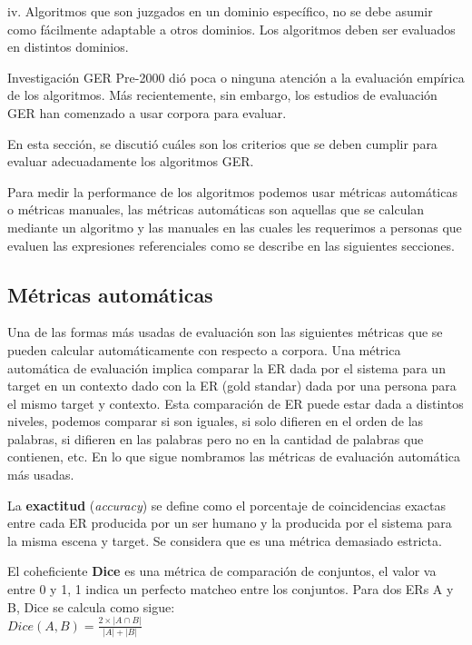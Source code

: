 iv. Algoritmos que son juzgados en un dominio espec\'ifico, no se debe asumir como
f\'acilmente adaptable a otros dominios. Los algoritmos deben ser evaluados en distintos dominios.

Investigaci\'on GER Pre-2000 di\'o poca o ninguna atenci\'on a la evaluaci\'on emp\'irica de los algoritmos. M\'as 
recientemente, sin embargo, los estudios de evaluaci\'on GER han comenzado a usar corpora para evaluar.

En esta secci\'on, se discuti\'o cu\'ales son los criterios que se deben cumplir
para evaluar adecuadamente los algoritmos GER.

Para medir la performance de los algoritmos podemos usar m\'etricas autom\'aticas o m\'etricas manuales, las m\'etricas autom\'aticas son aquellas que se calculan mediante un algoritmo y las manuales en las cuales les requerimos a personas que evaluen las expresiones referenciales como se describe en las siguientes secciones.


\subsection{M\'etricas autom\'aticas}
\label{sec:metricasAutomaticas}

Una de las formas m\'as usadas de evaluaci\'on son las siguientes m\'etricas que se pueden calcular autom\'aticamente con respecto a corpora.
Una m\'etrica autom\'atica de evaluaci\'on implica comparar la ER dada por el sistema para un target en un contexto dado con la ER (gold standar) dada por una persona para el mismo target y contexto.
Esta comparaci\'on de ER puede estar dada a distintos niveles, podemos comparar si son iguales, si solo difieren en el orden de las palabras, si difieren en las palabras pero no en la cantidad de palabras que contienen, etc. En lo que sigue nombramos las m\'etricas de evaluaci\'on autom\'atica m\'as usadas.

La \textbf{exactitud} ({\it accuracy}) se define como el porcentaje de coincidencias exactas entre cada ER producida por un ser humano y la producida por el sistema para la misma escena y target. Se considera que es una m\'etrica demasiado estricta.

El coheficiente \textbf{Dice} es una m\'etrica de comparaci\'on de conjuntos, el valor va entre 0 y 1, 1 indica un perfecto matcheo entre los conjuntos. Para dos ERs A y B, Dice se calcula como sigue:\\

$Dice(A,B) = \frac{2\times|A \cap B|}{|A|+|B|}$\\

